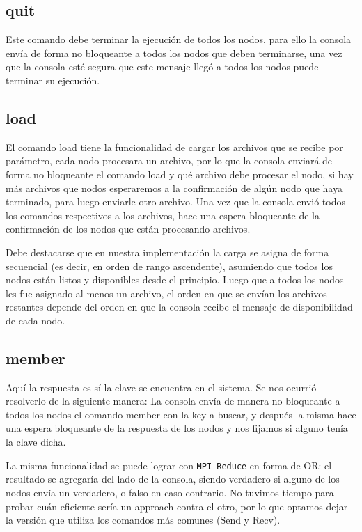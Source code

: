\subsection{quit}

Este comando debe terminar la ejecución de todos los nodos, para ello la consola envía de forma no bloqueante a todos los nodos que deben terminarse, una vez que la consola esté segura que este mensaje llegó a todos los nodos puede terminar su ejecución.

\subsection{load}

El comando load tiene la funcionalidad de cargar los archivos que se recibe por parámetro, cada nodo procesara un archivo, por lo que la consola enviará de forma no bloqueante el comando load y qué archivo debe procesar el nodo, si hay más archivos que nodos esperaremos a la confirmación de algún nodo que haya terminado, para luego enviarle otro archivo. Una vez que la consola envió todos los comandos respectivos a los archivos, hace una espera bloqueante de la confirmación de los nodos que están procesando archivos.

Debe destacarse que en nuestra implementación la carga se asigna de forma secuencial (es decir, en orden de rango ascendente), asumiendo que todos los nodos están listos y disponibles desde el principio. Luego que a todos los nodos les fue asignado al menos un archivo, el orden en que se envían los archivos restantes depende del orden en que la consola recibe el mensaje de disponibilidad de cada nodo.

\subsection{member}

Aquí la respuesta es sí la clave se encuentra en el sistema. Se nos ocurrió resolverlo de la siguiente manera: La consola envía de manera no bloqueante a todos los nodos el comando member con la key a buscar, y después la misma hace una espera bloqueante de la respuesta de los nodos y nos fijamos si alguno tenía la clave dicha.

La misma funcionalidad se puede lograr con \texttt{MPI\_Reduce} en forma de OR: el resultado se agregaría del lado de la consola, siendo verdadero si alguno de los nodos envía un verdadero, o falso en caso contrario. No tuvimos tiempo para probar cuán eficiente sería un approach contra el otro, por lo que optamos dejar la versión que utiliza los comandos más comunes (Send y Recv).


